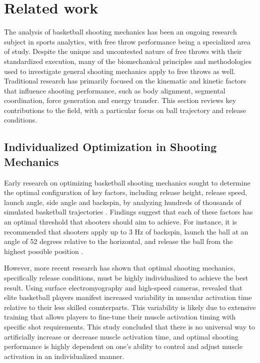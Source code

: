 \documentclass{article}
\begin{document}
  \section{Related work}
  
    The analysis of basketball shooting mechanics has been an ongoing research subject in sports analytics, with free throw performance being a specialized area of study. Despite the unique and uncontested nature of free throws with their standardized execution, many of the biomechanical principles and methodologies used to investigate general shooting mechanics apply to free throws as well. Traditional research has primarily focused on the kinematic and kinetic factors that influence shooting performance, such as body alignment, segmental coordination, force generation and energy transfer. This section reviews key contributions to the field, with a particular focus on ball trajectory and release conditions.

    \subsection{Individualized Optimization in Shooting Mechanics}

      Early research on optimizing basketball shooting mechanics sought to determine the optimal configuration of key factors, including release height, release speed, launch angle, side angle and backspin, by analyzing hundreds of thousands of simulated basketball trajectories \citep{tran_optimal_2008}. Findings suggest that each of these factors has an optimal threshold that shooters should aim to achieve. For instance, it is recommended that shooters apply up to 3 Hz of backspin, launch the ball at an angle of 52 degrees relative to the horizontal, and release the ball from the highest possible position \citep{tran_optimal_2008}.

      However, more recent research has shown that optimal shooting mechanics, specifically release conditions, must be highly individualized to achieve the best result. Using surface electromyography and high-speed cameras, \citet{pakosz_muscle_2021} revealed that elite basketball players manifest increased variability in muscular activation time relative to their less skilled counterparts. This variability is likely due to extensive training that allows players to fine-tune their muscle activation timing with specific shot requirements. This study concluded that there is no universal way to artificially increase or decrease muscle activation time, and optimal shooting performance is highly dependent on one's ability to control and adjust muscle activation in an individualized manner. 
\end{document}
